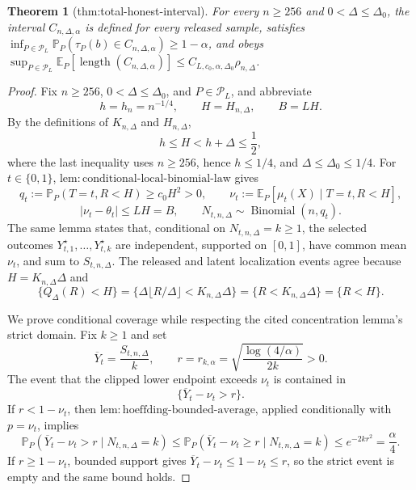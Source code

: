 \documentclass{article}
\newtheorem{theorem}{Theorem}
\begin{document}
\begin{theorem}[thm:total-honest-interval]\label{thm:total-honest-interval}
For every \(n\geq256\) and \(0<\Delta\leq\Delta_0\), the interval \(C_{n,\Delta,\alpha}\) is defined for every released sample, satisfies \(\inf_{P\in\mathcal P_L}\mathbb P_P(\tau_P(b)\in C_{n,\Delta,\alpha})\geq1-\alpha\), and obeys \(\sup_{P\in\mathcal P_L}\mathbb E_P[\operatorname{length}(C_{n,\Delta,\alpha})]\leq C_{L,c_0,\alpha,\Delta_0}\rho_{n,\Delta}\).
\end{theorem}
\begin{proof}
Fix \(n\geq256\), \(0<\Delta\leq\Delta_0\), and \(P\in\mathcal P_L\), and abbreviate
\[
 h=h_n=n^{-1/4},\qquad H=H_{n,\Delta},\qquad B=LH.
\]
By the definitions of \(K_{n,\Delta}\) and \(H_{n,\Delta}\),
\[
 h\leq H<h+\Delta\leq\frac12,
\]
where the last inequality uses \(n\geq256\), hence \(h\leq1/4\), and \(\Delta\leq\Delta_0\leq1/4\).  For \(t\in\{0,1\}\), \(\mathrm{lem:conditional\text{-}local\text{-}binomial\text{-}law}\) gives
\[
 q_t:=\mathbb P_P(T=t,R<H)\geq c_0H^2>0,
 \qquad
 \nu_t:=\mathbb E_P[\mu_t(X)\mid T=t,R<H],
\]
\[
 |\nu_t-\theta_t|\leq LH=B,
 \qquad
 N_{t,n,\Delta}\sim\operatorname{Binomial}(n,q_t).
\]
The same lemma states that, conditional on \(N_{t,n,\Delta}=k\geq1\), the selected outcomes \(Y_{t,1}^{\star},\ldots,Y_{t,k}^{\star}\) are independent, supported on \([0,1]\), have common mean \(\nu_t\), and sum to \(S_{t,n,\Delta}\).  The released and latent localization events agree because \(H=K_{n,\Delta}\Delta\) and
\[
 \{Q_\Delta(R)<H\}
 =\{\Delta\lfloor R/\Delta\rfloor<K_{n,\Delta}\Delta\}
 =\{R<K_{n,\Delta}\Delta\}
 =\{R<H\}.
\]

We prove conditional coverage while respecting the cited concentration lemma's strict domain.  Fix \(k\geq1\) and set
\[
 \overline Y_t=\frac{S_{t,n,\Delta}}k,
 \qquad
 r=r_{k,\alpha}=\sqrt{\frac{\log(4/\alpha)}{2k}}>0.
\]
The event that the clipped lower endpoint exceeds \(\nu_t\) is contained in
\[
 \{\overline Y_t-\nu_t>r\}.
\]
If \(r<1-\nu_t\), then \(\mathrm{lem:hoeffding\text{-}bounded\text{-}average}\), applied conditionally with \(p=\nu_t\), implies
\[
 \mathbb P_P(\overline Y_t-\nu_t>r\mid N_{t,n,\Delta}=k)
 \leq\mathbb P_P(\overline Y_t-\nu_t\geq r\mid N_{t,n,\Delta}=k)
 \leq e^{-2kr^2}=\frac\alpha4.
\]
If \(r\geq1-\nu_t\), bounded support gives \(\overline Y_t-\nu_t\leq1-\nu_t\leq r\), so the strict event is empty and the same bound holds.


\end{proof}
\end{document}
